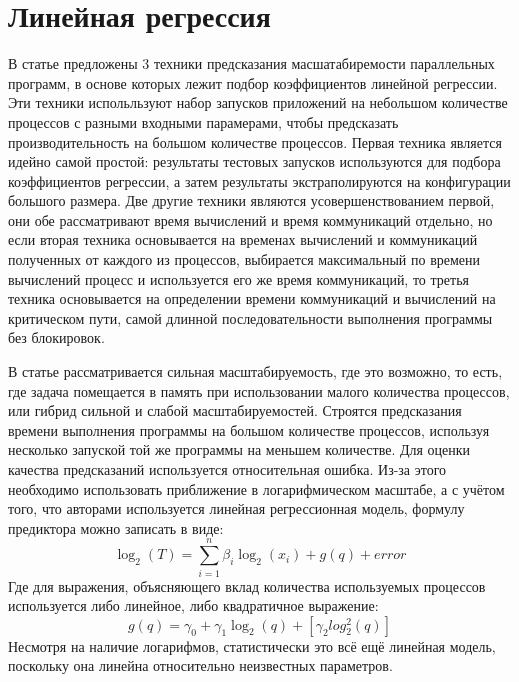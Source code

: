 	\section{Линейная регрессия}
		В статье \cite{log_main} предложены 3 техники предсказания масшатабиремости параллельных программ, в основе которых лежит подбор коэффициентов линейной регрессии. Эти техники испольльзуют набор запусков приложений на небольшом количестве процессов с разными входными парамерами, чтобы предсказать производительность на большом количестве процессов. Первая техника является идейно самой простой: результаты тестовых запусков используются для подбора коэффициентов регрессии, а затем результаты экстраполируются на конфигурации большого размера. Две другие техники являются усовершенствованием первой, они обе рассматривают время вычислений и время коммуникаций отдельно, но если вторая техника основывается на временах вычислений и коммуникаций полученных от каждого из процессов, выбирается максимальный по времени вычислений процесс и используется его же время коммуникаций, то третья техника основывается на определении времени коммуникаций и вычислений на критическом пути, самой длинной последовательности выполнения программы без блокировок.

		В статье рассматривается сильная масштабируемость, где это возможно, то есть, где задача помещается в память при использовании малого количества процессов, или гибрид сильной и слабой масштабируемостей. Строятся предсказания времени выполнения программы на большом количестве процессов, используя несколько запуской той же программы на меньшем количестве. Для оценки качества предсказаний используется относительная ошибка.	Из-за этого необходимо использовать приближение в логарифмическом масштабе, а с учётом того, что авторами используется линейная регрессионная модель, формулу предиктора можно записать в виде:
		\begin{equation}
		\log_2{(T)} = \sum_{i=1}^{n}{\beta_i\log_2{(x_i)}} + g(q) + error
		\end{equation}
		Где для выражения, объясняющего вклад количества используемых процессов используется либо линейное, либо квадратичное выражение:
		\begin{equation}
		g(q) = \gamma_0 + \gamma_1\log_2(q) + [\gamma_2log_2^2(q)]
		\end{equation}
		Несмотря на наличие логарифмов, статистически это всё ещё линейная модель, поскольку она линейна относительно неизвестных параметров.


